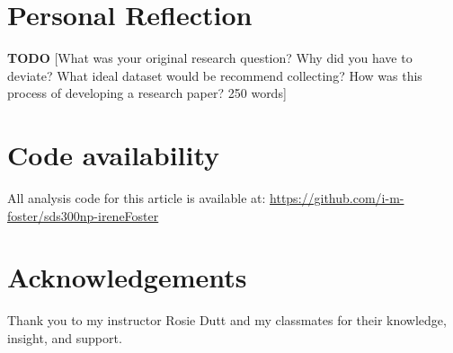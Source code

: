 \documentclass[,article,,moreauthors,pdftex]{mdpi}
\begin{document}
\hypertarget{personal-reflection}{%
\section{Personal Reflection}\label{personal-reflection}}

\textbf{TODO} {[}What was your original research question? Why did you
have to deviate? What ideal dataset would be recommend collecting? How
was this process of developing a research paper? 250 words{]}

\hypertarget{code-availability}{%
\section{Code availability}\label{code-availability}}

All analysis code for this article is available at:
\url{https://github.com/i-m-foster/sds300np-ireneFoster}

\hypertarget{acknowledgements}{%
\section{Acknowledgements}\label{acknowledgements}}

Thank you to my instructor Rosie Dutt and my classmates for their
knowledge, insight, and support.

%

\vspace{6pt}






\end{document}

